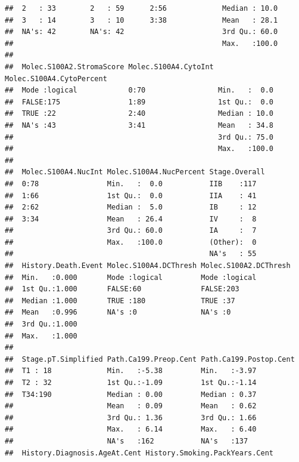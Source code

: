 \documentclass{article}\usepackage[]{graphicx}\usepackage[]{color}
\makeatletter
\newenvironment{kframe}{%
 \def\at@end@of@kframe{}%
 \ifinner\ifhmode%
  \def\at@end@of@kframe{\end{minipage}}%
  \begin{minipage}{\columnwidth}%
 \fi\fi%
 \def\FrameCommand##1{\hskip\@totalleftmargin \hskip-\fboxsep
 \colorbox{shadecolor}{##1}\hskip-\fboxsep
     \hskip-\linewidth \hskip-\@totalleftmargin \hskip\columnwidth}%
 \MakeFramed {\advance\hsize-\width
   \@totalleftmargin\z@ \linewidth\hsize
   \@setminipage}}%
 {\par\unskip\endMakeFramed%
 \at@end@of@kframe}
\newenvironment{knitrout}{}{} %
\makeatother
\begin{document}
\begin{knitrout}
\begin{kframe}
\begin{verbatim}
##  2   : 33        2   : 59      2:56             Median : 10.0       
##  3   : 14        3   : 10      3:38             Mean   : 28.1       
##  NA's: 42        NA's: 42                       3rd Qu.: 60.0       
##                                                 Max.   :100.0       
##                                                                     
##  Molec.S100A2.StromaScore Molec.S100A4.CytoInt Molec.S100A4.CytoPercent
##  Mode :logical            0:70                 Min.   :  0.0           
##  FALSE:175                1:89                 1st Qu.:  0.0           
##  TRUE :22                 2:40                 Median : 10.0           
##  NA's :43                 3:41                 Mean   : 34.8           
##                                                3rd Qu.: 75.0           
##                                                Max.   :100.0           
##                                                                        
##  Molec.S100A4.NucInt Molec.S100A4.NucPercent Stage.Overall
##  0:78                Min.   :  0.0           IIB    :117  
##  1:66                1st Qu.:  0.0           IIA    : 41  
##  2:62                Median :  5.0           IB     : 12  
##  3:34                Mean   : 26.4           IV     :  8  
##                      3rd Qu.: 60.0           IA     :  7  
##                      Max.   :100.0           (Other):  0  
##                                              NA's   : 55  
##  History.Death.Event Molec.S100A4.DCThresh Molec.S100A2.DCThresh
##  Min.   :0.000       Mode :logical         Mode :logical        
##  1st Qu.:1.000       FALSE:60              FALSE:203            
##  Median :1.000       TRUE :180             TRUE :37             
##  Mean   :0.996       NA's :0               NA's :0              
##  3rd Qu.:1.000                                                  
##  Max.   :1.000                                                  
##                                                                 
##  Stage.pT.Simplified Path.Ca199.Preop.Cent Path.Ca199.Postop.Cent
##  T1 : 18             Min.   :-5.38         Min.   :-3.97         
##  T2 : 32             1st Qu.:-1.09         1st Qu.:-1.14         
##  T34:190             Median : 0.00         Median : 0.37         
##                      Mean   : 0.09         Mean   : 0.62         
##                      3rd Qu.: 1.36         3rd Qu.: 1.66         
##                      Max.   : 6.14         Max.   : 6.40         
##                      NA's   :162           NA's   :137           
##  History.Diagnosis.AgeAt.Cent History.Smoking.PackYears.Cent

\end{verbatim}
\end{kframe}
\end{knitrout}
\end{document}
